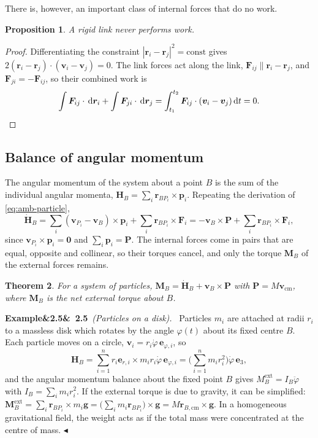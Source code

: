 \documentclass[11pt,a4paper,oneside]{report}
\numberwithin{equation}{chapter}
\newcommand{\vect}[1]{\bm{#1}}
\newcommand{\e}[1]{\vect{e}_{#1}}
\newcommand{\dd}{\,\mathrm{d}}
\newcommand{\cm}{\mathrm{cm}}
\newcommand{\ext}{\mathrm{ext}}
\theoremstyle{plain}
\newtheorem{theorem}{Theorem}[chapter]
\newtheorem{proposition}[theorem]{Proposition}
\theoremstyle{definition}
\theoremstyle{remark}
\newenvironment{example}[2]{%
  \par\addvspace{\bigskipamount}\noindent
  \textbf{Example\ifx&#1&\else~#1\fi}\ \textit{(#2).}\ \ignorespaces}%
  {\hfill$\blacktriangleleft$\par\addvspace{\bigskipamount}}
\begin{document}
There is, however, an important class of internal forces that do no work.

\begin{proposition}
A rigid link never performs work.
\end{proposition}
\begin{proof}
Differentiating the constraint $|\vect r_i-\vect r_j|^2=\text{const}$ gives
$2(\vect r_i-\vect r_j)\cdot(\vect v_i-\vect v_j)=0$. The link forces act along the link,
$\vect F_{ij}\parallel\vect r_i-\vect r_j$, and $\vect F_{ji}=-\vect F_{ij}$, so their combined work is
\[
  \int\vect F_{ij}\cdot\dd\vect r_i+\int\vect F_{ji}\cdot\dd\vect r_j=\int_{t_1}^{t_2}\vect F_{ij}\cdot(\vect v_i-\vect v_j)\dd t=0 .\qedhere
\]
\end{proof}

\subsection{Balance of angular momentum}
The angular momentum of the system about a point $B$ is the sum of the individual angular momenta,
$\vect H_B=\sum_i\vect r_{BP_i}\times\vect p_i$. Repeating the derivation of \eqref{eq:amb-particle},
\[
  \dot{\vect H}_B=\sum_{i}(\vect v_{P_i}-\vect v_B)\times\vect p_i+\sum_i\vect r_{BP_i}\times\vect F_i
  =-\vect v_B\times\vect P+\sum_i\vect r_{BP_i}\times\vect F_i ,
\]
since $\vect v_{P_i}\times\vect p_i=\vect 0$ and $\sum_i\vect p_i=\vect P$. The internal forces come in pairs that are
equal, opposite and collinear, so their torques cancel, and only the torque $\vect M_B$ of the external forces remains.

\begin{theorem}
For a system of particles, $\vect M_B=\dot{\vect H}_B+\vect v_B\times\vect P$ with $\vect P=M\vect v_\cm$, where
$\vect M_B$ is the net external torque about $B$.
\end{theorem}

\begin{example}{2.5}{Particles on a disk}
Particles $m_i$ are attached at radii $r_i$ to a massless disk which rotates by the angle $\varphi(t)$ about its fixed
centre $B$. Each particle moves on a circle, $\vect v_i=r_i\dot\varphi\,\vect e_{\varphi,i}$, so
\[
  \vect H_B=\sum_{i=1}^nr_i\vect e_{r,i}\times m_ir_i\dot\varphi\,\vect e_{\varphi,i}=\Big(\sum_{i=1}^nm_ir_i^2\Big)\dot\varphi\,\e3 ,
\]
and the angular momentum balance about the fixed point $B$ gives
$M_B^{\ext}=I_B\ddot\varphi$ with $I_B=\sum_im_ir_i^2$. If the external torque is due to gravity, it can be
simplified: $\vect M_B^{\ext}=\sum_i\vect r_{BP_i}\times m_i\vect g=\big(\sum_im_i\vect r_{BP_i}\big)\times\vect g=
M\vect r_{B,\cm}\times\vect g$. In a homogeneous gravitational field, the weight acts as if the total mass were
concentrated at the centre of mass.
\end{example}
\end{document}
